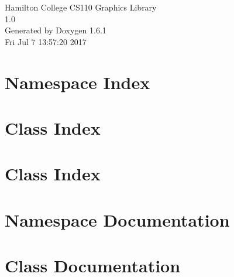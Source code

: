 \documentclass[a4paper]{book}
\begin{document}
\hypersetup{pageanchor=false}
\begin{titlepage}
\vspace*{7cm}
\begin{center}
{\Large Hamilton College CS110 Graphics Library \\[1ex]\large 1.0 }\\
\vspace*{1cm}
{\large Generated by Doxygen 1.6.1}\\
\vspace*{0.5cm}
{\small Fri Jul 7 13:57:20 2017}\\
\end{center}
\end{titlepage}
\clearemptydoublepage
{}
\tableofcontents
\clearemptydoublepage
{}
\hypersetup{pageanchor=true}
\chapter{Namespace Index}

\chapter{Class Index}

\chapter{Class Index}

\chapter{Namespace Documentation}

\chapter{Class Documentation}














\printindex
\end{document}
